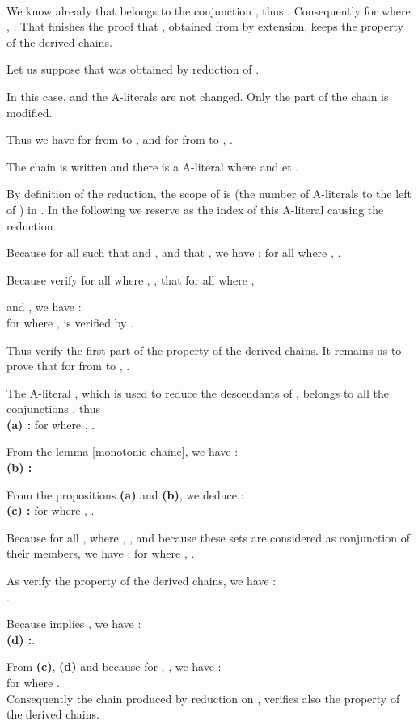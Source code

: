 \documentclass{article}
\newenvironment{preuve}{\noindent {\em Proof :}\ }{{\hfill
    }\vspace{.5pc}} \newcommand{\sg}{\!\!<\!\!}
\begin{document}
\begin{preuve}
\begin{itemrond}
We know already that   belongs to the conjunction , thus .
Consequently for  where , .  
That finishes the proof that , obtained from  by extension, keeps the property of the derived chains.



\item Let us suppose that  was obtained by reduction of .

In this case,  and the A-literals are not changed. Only the part  of the chain  is modified.

Thus we have for  from  to ,   and for   from  to , .

The chain  is written  and there is a A-literal  where  and  et .

By definition of the reduction,  the scope of 
   is   (the number of A-literals to the left of ) in . 
In the following we reserve  as the index of this A-literal causing the reduction.

Because for all  such that  and ,  and that , we have :
 for all  where , .

Because  verify for all  where , , that for all  where , 

and , we have :\\
for  where ,  is verified by .

Thus  verify the first part of the property of the derived chains. It remains us to prove that
for  from  to , .


The A-literal , which is used to reduce the descendants of , belongs to all the 
conjunctions , thus \\
\textbf{ (a) : }for  where , .

From the lemma \ref{monotonie-chaine}, we have :\\
\textbf{ (b) :} 

From the propositions \textbf{(a)} and \textbf{(b)}, we deduce :\\
\textbf{ (c) :} for  where  , .

Because for all  , where , , and because these sets are considered as 
conjunction of their members, we have :
for  where , .

As  verify the property of the derived chains, we have  : \\.

Because  implies , we have : \\
\textbf{ (d) :}.

From \textbf{(c)}, \textbf{(d)} and because for , , we have :\\
for  where .\\
Consequently the chain  produced by reduction on , verifies also the property of the derived chains.


\end{itemrond}
\end{preuve}
\end{document}

